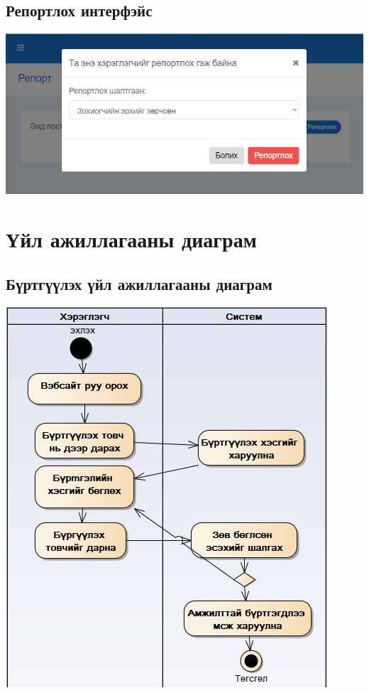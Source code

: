 \documentclass[
oneside, %
english, %
onehalfspacing, %
nolistspacing, %
headsepline, %
]{article} %
\begin{document}
      \subsection{Репортлох интерфэйс}
     \includegraphics[width=\textwidth]{delgets2}
     	
     	\section{Үйл ажиллагааны диаграм}
     	\subsection{Бүртгүүлэх үйл ажиллагааны диаграм}
     	\includegraphics[width=\textwidth]{regActivity}
\end{document}
